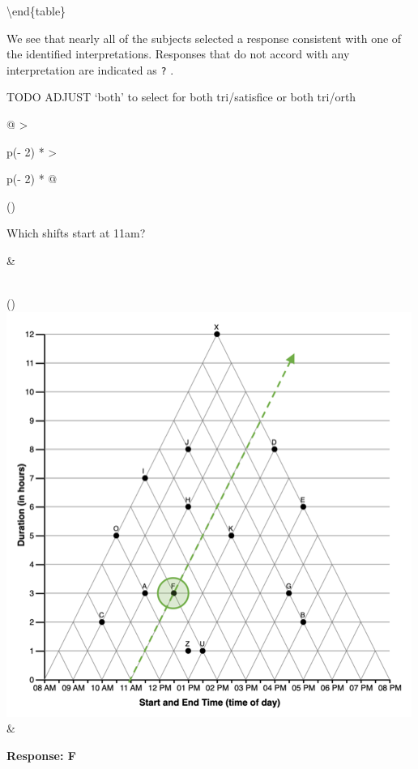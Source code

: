 \documentclass[
  letterpaper,
  DIV=11,
  numbers=noendperiod]{scrreprt}
\begin{document}
\textbackslash end\{table\}

We see that nearly all of the subjects selected a response consistent
with one of the identified interpretations. Responses that do not accord
with any interpretation are indicated as \texttt{?} .

TODO ADJUST `both' to select for both tri/satisfice or both tri/orth

\begin{longtable}[]{@{}
  >{\raggedright\arraybackslash}p{(\columnwidth - 2\tabcolsep) * }
  >{\raggedright\arraybackslash}p{(\columnwidth - 2\tabcolsep) * }@{}}
\toprule()
\begin{minipage}[b]{\linewidth}\raggedright
Which shifts start at 11am?
\end{minipage} & \begin{minipage}[b]{\linewidth}\raggedright
\end{minipage} \\
\midrule()
\endhead
\includegraphics{analysis/SGC3A/static/interpretations/Q1_121_F.png} &
\begin{minipage}[t]{\linewidth}\raggedright
\textbf{Response: F}


\end{minipage}
\end{longtable}
\end{document}
